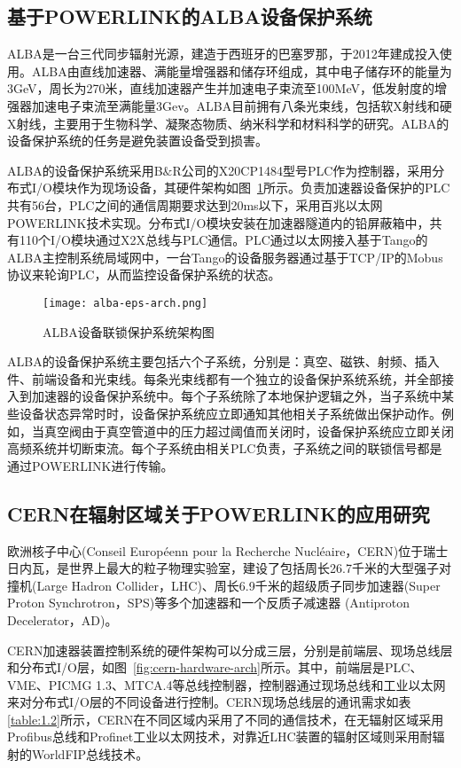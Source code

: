 \subsection{基于POWERLINK的ALBA设备保护系统}
ALBA是一台三代同步辐射光源，建造于西班牙的巴塞罗那，于2012年建成投入使用。ALBA由直线加速器、满能量增强器和储存环组成，其中电子储存环的能量为3GeV，周长为270米，直线加速器产生并加速电子束流至100MeV，低发射度的增强器加速电子束流至满能量3Gev。ALBA目前拥有八条光束线，包括软X射线和硬X射线，主要用于生物科学、凝聚态物质、纳米科学和材料科学的研究。ALBA的设备保护系统的任务是避免装置设备受到损害。

ALBA的设备保护系统采用B$\&$R公司的X20CP1484型号PLC作为控制器，采用分布式I/O模块作为现场设备，其硬件架构如图~\ref{fig:alba-eps-arch}所示。负责加速器设备保护的PLC共有56台，PLC之间的通信周期要求达到20ms以下，采用百兆以太网POWERLINK技术实现。分布式I/O模块安装在加速器隧道内的铅屏蔽箱中，共有110个I/O模块通过X2X总线与PLC通信\cite{Alba-eps}。PLC通过以太网接入基于Tango的ALBA主控制系统局域网中，一台Tango的设备服务器通过基于TCP/IP的Mobus协议来轮询PLC，从而监控设备保护系统的状态。

\begin{figure}[!htb]
	\centering
	\texttt{[image: alba-eps-arch.png]}
	\caption{ALBA设备联锁保护系统架构图}
	\label{fig:alba-eps-arch}
\end{figure}

ALBA的设备保护系统主要包括六个子系统，分别是：真空、磁铁、射频、插入件、前端设备和光束线。每条光束线都有一个独立的设备保护系统系统，并全部接入到加速器的设备保护系统中。每个子系统除了本地保护逻辑之外，当子系统中某些设备状态异常时时，设备保护系统应立即通知其他相关子系统做出保护动作。例如，当真空阀由于真空管道中的压力超过阈值而关闭时，设备保护系统应立即关闭高频系统并切断束流。每个子系统由相关PLC负责，子系统之间的联锁信号都是通过POWERLINK进行传输。


\subsection{CERN在辐射区域关于POWERLINK的应用研究}
欧洲核子中心(Conseil Européenn pour la Recherche Nucléaire，CERN)位于瑞士日内瓦，是世界上最大的粒子物理实验室，建设了包括周长26.7千米的大型强子对撞机(Large Hadron Collider，LHC)、周长6.9千米的超级质子同步加速器(Super Proton Synchrotron，SPS)等多个加速器和一个反质子减速器 (Antiproton Decelerator，AD)。

CERN加速器装置控制系统的硬件架构可以分成三层，分别是前端层、现场总线层和分布式I/O层，如图~\ref{fig:cern-hardware-arch}所示。其中，前端层是PLC、VME、PICMG 1.3、MTCA.4等总线控制器，控制器通过现场总线和工业以太网来对分布式I/O层的不同设备进行控制。CERN现场总线层的通讯需求如表\ref{table:1.2}所示，CERN在不同区域内采用了不同的通信技术，在无辐射区域采用Profibus总线和Profinet工业以太网技术，对靠近LHC装置的辐射区域则采用耐辐射的WorldFIP总线技术\cite{Daniluk2017}。

